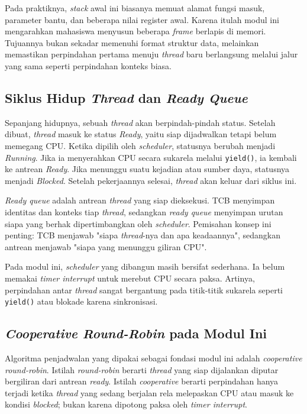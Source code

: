 Pada praktiknya, \textit{stack} awal ini biasanya memuat alamat fungsi masuk, parameter bantu, dan beberapa nilai register awal. Karena itulah modul ini mengarahkan mahasiswa menyusun beberapa \textit{frame} berlapis di memori. Tujuannya bukan sekadar memenuhi format struktur data, melainkan memastikan perpindahan pertama menuju \textit{thread} baru berlangsung melalui jalur yang sama seperti perpindahan konteks biasa.

\subsection{Siklus Hidup \textit{Thread} dan \textit{Ready Queue}}
Sepanjang hidupnya, sebuah \textit{thread} akan berpindah-pindah status. Setelah dibuat, \textit{thread} masuk ke status \textit{Ready}, yaitu siap dijadwalkan tetapi belum memegang CPU. Ketika dipilih oleh \textit{scheduler}, statusnya berubah menjadi \textit{Running}. Jika ia menyerahkan CPU secara sukarela melalui \texttt{yield()}, ia kembali ke antrean \textit{Ready}. Jika menunggu suatu kejadian atau sumber daya, statusnya menjadi \textit{Blocked}. Setelah pekerjaannya selesai, \textit{thread} akan keluar dari siklus ini.

\textit{Ready queue} adalah antrean \textit{thread} yang siap dieksekusi. TCB menyimpan identitas dan konteks tiap \textit{thread}, sedangkan \textit{ready queue} menyimpan urutan siapa yang berhak dipertimbangkan oleh \textit{scheduler}. Pemisahan konsep ini penting: TCB menjawab "siapa \textit{thread}-nya dan apa keadaannya", sedangkan antrean menjawab "siapa yang menunggu giliran CPU".

Pada modul ini, \textit{scheduler} yang dibangun masih bersifat sederhana. Ia belum memakai \textit{timer interrupt} untuk merebut CPU secara paksa. Artinya, perpindahan antar \textit{thread} sangat bergantung pada titik-titik sukarela seperti \texttt{yield()} atau blokade karena sinkronisasi.


\subsection{\textit{Cooperative Round-Robin} pada Modul Ini}
Algoritma penjadwalan yang dipakai sebagai fondasi modul ini adalah \textit{cooperative round-robin}. Istilah \textit{round-robin} berarti \textit{thread} yang siap dijalankan diputar bergiliran dari antrean \textit{ready}. Istilah \textit{cooperative} berarti perpindahan hanya terjadi ketika \textit{thread} yang sedang berjalan rela melepaskan CPU atau masuk ke kondisi \textit{blocked}; bukan karena dipotong paksa oleh \textit{timer interrupt}.

